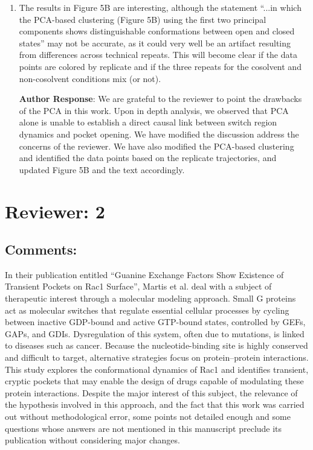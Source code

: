 \documentclass[11pt, a4paper]{article}
\begin{document}
\begin{enumerate}
    \item The results in Figure 5B are interesting, although the statement “...in which the PCA-based clustering (Figure 5B) using the first two principal components shows distinguishable conformations between open and closed states” may not be accurate, as it could very well be an artifact resulting from differences across technical repeats. This will become clear if the data points are colored by replicate and if the three repeats for the cosolvent and non-cosolvent conditions mix (or not).

\textbf{Author Response}: We are grateful to the reviewer to point the drawbacks of the PCA in this work. Upon in depth analysis, we observed that PCA alone is unable to establish a direct causal link between switch region dynamics and pocket opening. We have modified the discussion address the concerns of the reviewer. We have also modified the PCA-based clustering and identified the data points based on the replicate trajectories, and updated Figure 5B and the text accordingly. 

\end{enumerate}

\section{Reviewer: 2}

\subsection{Comments:}
In their publication entitled “Guanine Exchange Factors Show Existence of Transient Pockets on Rac1 Surface”, Martis et al. deal with a subject of therapeutic interest through a molecular modeling approach. Small G proteins act as molecular switches that regulate essential cellular processes by cycling between inactive GDP-bound and active GTP-bound states, controlled by GEFs, GAPs, and GDIs. Dysregulation of this system, often due to mutations, is linked to diseases such as cancer. Because the nucleotide-binding site is highly conserved and difficult to target, alternative strategies focus on protein–protein interactions. This study explores the conformational dynamics of Rac1 and identifies transient, cryptic pockets that may enable the design of drugs capable of modulating these protein interactions.
Despite the major interest of this subject, the relevance of the hypothesis involved in this approach, and the fact that this work was carried out without methodological error, some points not detailed enough and some questions whose answers are not mentioned in this manuscript preclude its publication without considering major changes.
\end{document}
